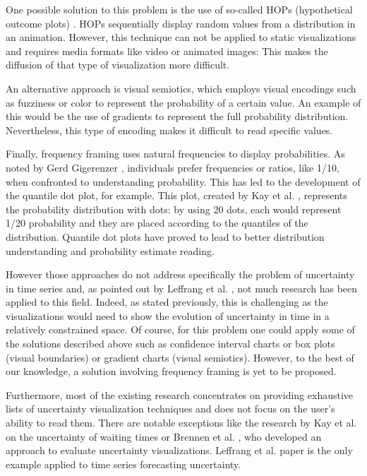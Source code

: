 \documentclass[a4paper,3p,sort&compress]{elsarticle}
\begin{document}
One possible solution to this problem is the use of so-called HOPs (hypothetical
outcome plots) \cite{padilla_uncertainty_2021}. HOPs sequentially display random
values from a distribution in an animation. However, this technique can not be
applied to static visualizations and requires media formats like video or
animated images: This makes the diffusion of that type of visualization more
difficult.

An alternative approach is visual semiotics, which employs visual encodings such
as fuzziness or color to represent the probability of a certain value. An
example of this would be the use of gradients to represent the full probability
distribution. Nevertheless, this type of encoding makes it difficult to read
specific values.

Finally, frequency framing uses natural frequencies to display probabilities. As
noted by Gerd Gigerenzer \cite{citation needed}, individuals prefer frequencies
or ratios, like 1/10, when confronted to understanding probability. This has led
to the development of the quantile dot plot, for example. This plot, created by
Kay et al. \cite{2016-when-ish-is-my-bus}, represents the probability
distribution with dots: by using 20 dots, each would represent 1/20 probability
and they are placed according to the quantiles of the distribution. Quantile dot
plots have proved to lead to better distribution understanding and probability
estimate reading.

However those approaches do not address specifically the problem of uncertainty
in time series and, as pointed out by Leffrang et al.
\cite{leffrang_should_2021}, not much research has been applied to this field.
Indeed, as stated previously, this is challenging as the visualizations would
need to show the evolution of uncertainty in time in a relatively constrained
space. Of course, for this problem one could apply some of the solutions
described above such as confidence interval charts or box plots (visual
boundaries) or gradient charts (visual semiotics). However, to the best of our
knowledge, a solution involving frequency framing is yet to be proposed.

Furthermore, most of the existing research concentrates on providing exhaustive
lists of uncertainty visualization techniques and does not focus on the user's
ability to read them. There are notable exceptions like the research by Kay et
al. \cite{2016-when-ish-is-my-bus} on the uncertainty of waiting times or
Brennen et al. \cite{brennen_instrument_2018}, who developed an approach to
evaluate uncertainty visualizations. Leffrang et al. \cite{leffrang_should_2021}
paper is the only example applied to time series forecasting uncertainty.
\end{document}
